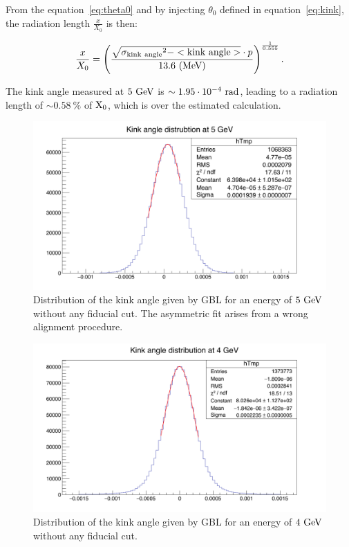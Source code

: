    From the equation~\ref{eq:theta0} and by injecting $\theta_0$ defined in equation~\ref{eq:kink}, the radiation length $\frac{x}{X_0}$ is then:
   
   \begin{equation}
     \frac{x}{X_{0}} = \left( \frac{\sqrt{\rm{\sigma_{kink~angle}}^2 - <\rm{kink~angle}>} \cdot p}{13.6~\rm{(MeV)}} \right)^{\frac{1}{0.555}}.
   \end{equation}

   The kink angle measured at $5~\rm{GeV}$ is $\sim 1.95 \cdot 10^{-4}~\rm{rad}$, leading to a radiation length of $\sim 0.58~\%$ of $\rm{X_0}$, which is over the estimated calculation.
   
   \begin{figure}[!h]
     \centering
     \includegraphics[width = \textwidth]{Pictures/X0/kinkAngle5GeV_2.png}
     \caption{Distribution of the kink angle given by GBL for an energy of $5~\rm{GeV}$ without any fiducial cut. The asymmetric fit arises from a wrong alignment procedure.}
     \label{fig:kinkAngle5GeV}
   \end{figure} 

   \begin{figure}[!p]
     \centering
     \includegraphics[width = \textwidth]{Pictures/X0/kinkAngle4GeV.png}
     \caption{Distribution of the kink angle given by GBL for an energy of $4~\rm{GeV}$ without any fiducial cut.}
     \label{fig:kinkAngle4GeV}
   \end{figure} 

